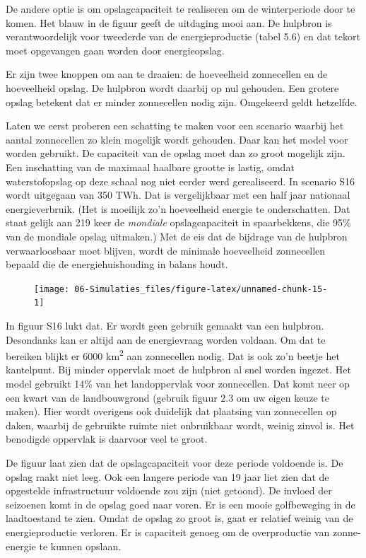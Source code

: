 \documentclass[
  11pt,
  a4paper,
]{book}
\begin{document}
De andere optie is om opslagcapaciteit te realiseren om de winterperiode door te komen. Het blauw in de figuur geeft de uitdaging mooi aan. De hulpbron is verantwoordelijk voor tweederde van de energieproductie (tabel 5.6) en dat tekort moet opgevangen gaan worden door energieopslag.

Er zijn twee knoppen om aan te draaien: de hoeveelheid zonnecellen en de hoeveelheid opslag. De hulpbron wordt daarbij op nul gehouden. Een grotere opslag betekent dat er minder zonnecellen nodig zijn. Omgekeerd geldt hetzelfde.

Laten we eerst proberen een schatting te maken voor een scenario waarbij het aantal zonnecellen zo klein mogelijk wordt gehouden. Daar kan het model voor worden gebruikt. De capaciteit van de opslag moet dan zo groot mogelijk zijn. Een inschatting van de maximaal haalbare grootte is lastig, omdat waterstofopslag op deze schaal nog niet eerder werd gerealiseerd. In scenario S16 wordt uitgegaan van 350 TWh. Dat is vergelijkbaar met een half jaar nationaal energieverbruik. (Het is moeilijk zo'n hoeveelheid energie te onderschatten. Dat staat gelijk aan 219 keer de \emph{mondiale} opslagcapaciteit in spaarbekkens, die 95\% van de mondiale opslag uitmaken.) Met de eis dat de bijdrage van de hulpbron verwaarloosbaar moet blijven, wordt de minimale hoeveelheid zonnecellen bepaald die de energiehuishouding in balans houdt.

\begin{figure}

{\centering \texttt{[image: 06-Simulaties\_files/figure-latex/unnamed-chunk-15-1]} 

}

\end{figure}

In figuur S16 lukt dat. Er wordt geen gebruik gemaakt van een hulpbron. Desondanks kan er altijd aan de energievraag worden voldaan. Om dat te bereiken blijkt er 6000 km\textsuperscript{2} aan zonnecellen nodig. Dat is ook zo'n beetje het kantelpunt. Bij minder oppervlak moet de hulpbron al snel worden ingezet. Het model gebruikt 14\% van het landoppervlak voor zonnecellen. Dat komt neer op een kwart van de landbouwgrond (gebruik figuur 2.3 om uw eigen keuze te maken). Hier wordt overigens ook duidelijk dat plaatsing van zonnecellen op daken, waarbij de gebruikte ruimte niet onbruikbaar wordt, weinig zinvol is. Het benodigde oppervlak is daarvoor veel te groot.

De figuur laat zien dat de opslagcapaciteit voor deze periode voldoende is. De opslag raakt niet leeg. Ook een langere periode van 19 jaar liet zien dat de opgestelde infrastructuur voldoende zou zijn (niet getoond). De invloed der seizoenen komt in de opslag goed naar voren. Er is een mooie golfbeweging in de laadtoestand te zien. Omdat de opslag zo groot is, gaat er relatief weinig van de energieproductie verloren. Er is capaciteit genoeg om de overproductie van zonne-energie te kunnen opslaan.
\end{document}
